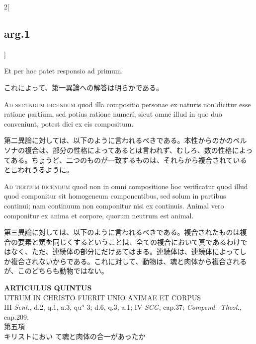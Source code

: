 \documentclass[paper=a4paper,fontsize=10pt,jafontsize=9pt,titlepage]{jlreq}
\begin{document}
\begin{paracol}{2}[\subsection{arg.1}]
\switchcolumn*

Et per hoc patet responsio ad primum.

\switchcolumn

これによって、第一異論への解答は明らかである。

\switchcolumn*[\subsection{ad.2}]

{\scshape Ad secundum dicendum} quod illa compositio personae ex
naturis non dicitur esse ratione partium, sed potius ratione numeri,
sicut omne illud in quo duo conveniunt, potest dici ex eis compositum.

\switchcolumn

第二異論に対しては、以下のように言われるべきである。本性からのかのペル
ソナの複合は、部分の性格によってあるとは言われず、むしろ、数の性格によっ
てある。ちょうど、二つのものが一致するものは、それらから複合されている
と言われうるように。

\switchcolumn*[\subsection{ad.3}]

{\scshape Ad tertium dicendum} quod non in omni compositione hoc
verificatur quod illud quod componitur sit homogeneum componentibus,
sed solum in partibus continui; nam continuum non componitur nisi ex
continuis. Animal vero componitur ex anima et corpore, quorum neutrum
est animal.

\switchcolumn

第三異論に対しては、以下のように言われるべきである。複合されたものは複
合の要素と類を同じくするということは、全ての複合において真であるわけで
はなく、ただ、連続体の部分にだけあてはまる。連続体は、連続体によってし
か複合されないからである。これに対して、動物は、魂と肉体から複合される
が、このどちらも動物ではない。

\end{paracol}
\newpage


{}
\setcounter{section}{5}
\setcounter{subsection}{0}
\begin{center}
{\Large {\bfseries ARTICULUS QUINTUS}}\\ {\large UTRUM IN CHRISTO FUERIT
UNIO ANIMAE ET CORPUS}\\ {\footnotesize III {\itshape Sent.}, d.2,
q.1, a.3, qu$^a$ 3; d.6, q.3, a.1; IV {\itshape SCG}, cap.37;
{\itshape Compend.~Theol.}, cap.209.}\\ {\Large 第五項\\キリストにおい
て魂と肉体の合一があったか}
\end{center}
\end{document}
